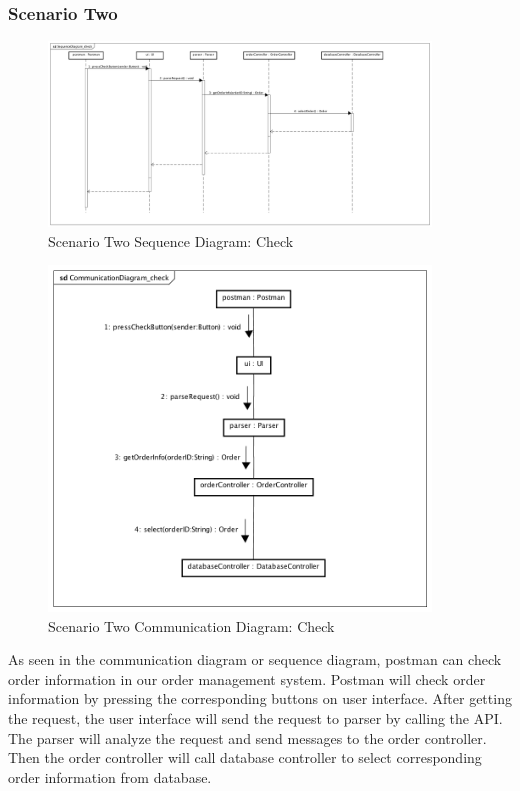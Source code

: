 \documentclass[12pt]{scrreprt}
\begin{document}
\subsubsection{Scenario Two}
\begin{figure}[H]
  \centering\includegraphics[width=4in]{DocumentRes/2SequenceDiagram_check.png}
  \caption{Scenario Two Sequence Diagram: Check}
\end{figure}
\begin{figure}[H]
  \centering\includegraphics[width=4in]{DocumentRes/2CommunicationDiagram_check.png}
  \caption{Scenario Two Communication Diagram: Check}
\end{figure}
As seen in the communication diagram or sequence diagram, postman can check order information in our order management system. Postman will check order information by pressing the corresponding buttons on user interface. After getting the request, the user interface will send the request to parser by calling the API. The parser will analyze the request and send messages to the order controller. Then the order controller will call database controller to select corresponding order information from database.
\end{document}
